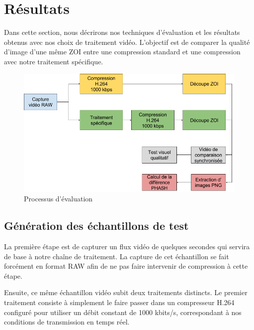 \documentclass[11pt,a4paper]{article}
\begin{document}
\section{Résultats}

Dans cette section, nous décrirons nos techniques d'évaluation et les résultats obtenus avec nos choix de traitement vidéo.
L'objectif est de comparer la qualité d'image d'une même ZOI entre une compression standard et une compression avec notre traitement spécifique.

\begin{figure}[H]
\begin{center}
\includegraphics[scale=0.4]{images/tests_schema.png}
\end{center}
\caption{Processus d'évaluation}
\label{}
\end{figure}

\subsection{Génération des échantillons de test}
La première étape est de capturer un flux vidéo de quelques secondes qui servira de base à notre chaîne de traitement.
La capture de cet échantillon se fait forcément en format RAW afin de ne pas faire intervenir de compression à cette étape.

\bigbreak
Ensuite, ce même échantillon vidéo subit deux traitements distincts.
Le premier traitement consiste à simplement le faire passer dans un compresseur H.264 configuré pour utiliser un débit constant de 1000 kbits/s, correspondant à nos conditions de transmission en temps réel.
\end{document}
